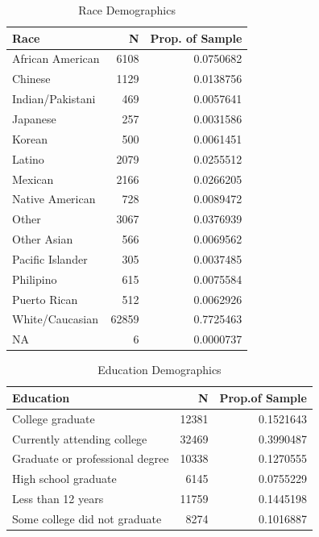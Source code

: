 \documentclass[
  english,
  man]{apa6}
\begin{document}
\begin{table}

\caption{\label{tab:KableOuput}Race Demographics}
\centering
\begin{tabular}[t]{l|r|r}
\hline
Race & N & Prop.  of Sample\\
\hline
African American & 6108 & 0.0750682\\
\hline
Chinese & 1129 & 0.0138756\\
\hline
Indian/Pakistani & 469 & 0.0057641\\
\hline
Japanese & 257 & 0.0031586\\
\hline
Korean & 500 & 0.0061451\\
\hline
Latino & 2079 & 0.0255512\\
\hline
Mexican & 2166 & 0.0266205\\
\hline
Native American & 728 & 0.0089472\\
\hline
Other & 3067 & 0.0376939\\
\hline
Other Asian & 566 & 0.0069562\\
\hline
Pacific Islander & 305 & 0.0037485\\
\hline
Philipino & 615 & 0.0075584\\
\hline
Puerto Rican & 512 & 0.0062926\\
\hline
White/Caucasian & 62859 & 0.7725463\\
\hline
NA & 6 & 0.0000737\\
\hline
\end{tabular}
\end{table}

\begin{table}

\caption{\label{tab:KableOuput}Education Demographics}
\centering
\begin{tabular}[t]{l|r|r}
\hline
Education & N & Prop.of Sample\\
\hline
College graduate & 12381 & 0.1521643\\
\hline
Currently attending college & 32469 & 0.3990487\\
\hline
Graduate or professional degree & 10338 & 0.1270555\\
\hline
High school graduate & 6145 & 0.0755229\\
\hline
Less than 12 years & 11759 & 0.1445198\\
\hline
Some college did not graduate & 8274 & 0.1016887\\
\hline
\end{tabular}
\end{table}
\end{document}
